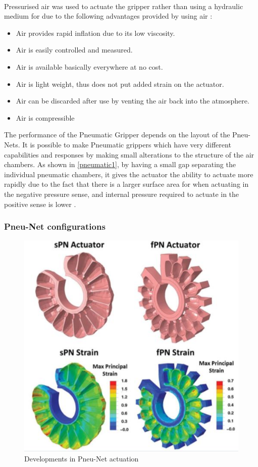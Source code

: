 \documentclass[11pt]{article}
\begin{document}
\\
\newline
Pressurised air was used to actuate the gripper rather than using a hydraulic medium for due to the following advantages provided by using air \cite{mosadegh2014pneumatic}:
\begin{itemize}
\item Air provides rapid inflation due to its low viscosity.
\item Air is easily controlled and measured.
\item Air is available basically everywhere at no cost.
\item Air is light weight, thus does not put added strain on the actuator.
\item Air can be discarded after use by venting the air back into the atmosphere.
\item Air is compressible
\\
\newline
\end{itemize}
The performance of the Pneumatic Gripper depends on the layout of the Pneu-Nets. It is possible to make Pneumatic grippers which have very different capabilities and responses by making small alterations to the structure of the air chambers. As shown in \ref{pneumatic1}, by having a small gap separating the individual pneumatic chambers, it gives the actuator the ability to actuate more rapidly due to the fact that there is a larger surface area for when actuating in the negative pressure sense, and internal pressure required to actuate in the positive sense is lower \cite{mosadegh2014pneumatic}.
\subsubsection{Pneu-Net configurations}
\begin{figure}[h]
\centering
\includegraphics[scale=0.8]{Pneumatic2}
\caption{Developments in Pneu-Net actuation}
\label{fig:Pneumatic2}
\end{figure}
\end{document}
